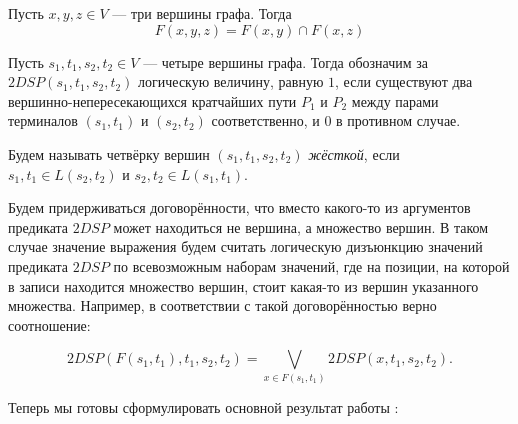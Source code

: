 \begin{definition}
Пусть $x, y, z \in V$ --- три вершины графа. Тогда
\begin{equation}
F(x, y, z) = F(x, y) \cap F(x, z)
\end{equation}
\end{definition}

\begin{definition}
Пусть $s_1, t_1, s_2, t_2 \in V$ --- четыре вершины графа. Тогда обозначим за $2DSP(s_1, t_1, s_2, t_2)$ логическую величину, равную $1$, если существуют два вершинно-непересекающихся кратчайших пути $P_1$ и $P_2$ между парами терминалов $(s_1, t_1)$ и $(s_2, t_2)$ соответственно, и $0$ в противном случае.
\end{definition}

\begin{definition}
Будем называть четвёрку вершин $(s_1, t_1, s_2, t_2)$ \textit{жёсткой}, если $s_1, t_1 \in L(s_2, t_2)$ и $s_2, t_2 \in L(s_1, t_1)$.
\end{definition}

Будем придерживаться договорённости, что вместо какого-то из аргументов предиката $2DSP$ может находиться не вершина, а множество вершин. В таком случае значение выражения будем считать логическую дизъюнкцию значений предиката $2DSP$ по всевозможным наборам значений, где на позиции, на которой в записи находится множество вершин, стоит какая-то из вершин указанного множества. Например, в соответствии с такой договорённостью верно соотношение: 

\begin{equation}
2DSP(F(s_1, t_1), t_1, s_2, t_2) = \bigvee\limits_{x \in F(s_1, t_1)} 2DSP(x, t_1, s_2, t_2).
\end{equation}

Теперь мы готовы сформулировать основной результат работы \cite{ET}:

